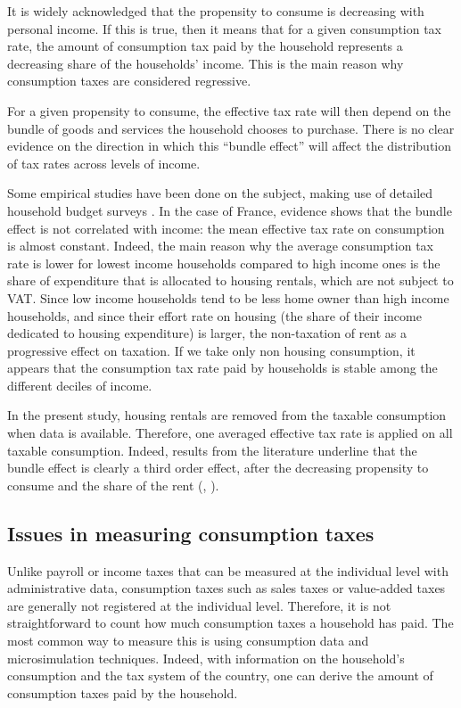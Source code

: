 \documentclass[12pt]{article}
\begin{document}
It is widely acknowledged that the propensity to consume is decreasing with personal income. If this is true, then it means that for a given consumption tax rate, the amount of consumption tax paid by the household represents a decreasing share of the households' income. This is the main reason why consumption taxes are considered regressive.

For a given propensity to consume, the effective tax rate will then depend on the bundle of goods and services the household chooses to purchase. There is no clear evidence on the direction in which this ``bundle effect'' will affect the distribution of tax rates across levels of income.

Some empirical studies have been done on the subject, making use of detailed household budget surveys \citep{dauvergne2012qui, boutchenik2015}. In the case of France, evidence shows that the bundle effect is not correlated with income: the mean effective tax rate on consumption is almost constant. Indeed, the main reason why the average consumption tax rate is lower for lowest income households compared to high income ones is the share of expenditure that is allocated to housing rentals, which are not subject to VAT. Since low income households tend to be less home owner than high income households, and since their effort rate on housing (the share of their income dedicated to housing expenditure) is larger, the non-taxation of rent as a progressive effect on taxation. If we take only non housing consumption, it appears that the consumption tax rate paid by households is stable among the different deciles of income. 

In the present study, housing rentals are removed from the taxable consumption when data is available. Therefore, one averaged effective tax rate is applied on all taxable consumption. Indeed, results from the literature underline that the bundle effect is clearly a third order effect, after the decreasing propensity to consume and the share of the rent (\cite{figari2015microsimulation}, \cite{decoster2010}).

\subsection{Issues in measuring consumption taxes}
Unlike payroll or income taxes that can be measured at the individual level with administrative data, consumption taxes such as sales taxes or value-added taxes are generally not registered at the individual level. Therefore, it is not straightforward to count how much consumption taxes a household has paid. The most common way to measure this is using consumption data and microsimulation techniques. Indeed, with information on the household's consumption and the tax system of the country, one can derive the amount of consumption taxes paid by the household.
\end{document}
